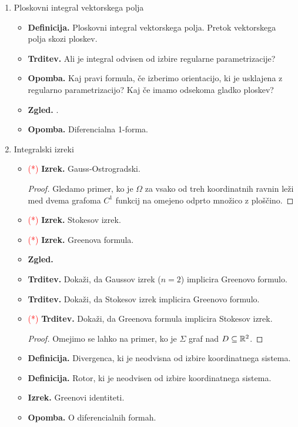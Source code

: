 \begin{enumerate}
    \item Ploskovni integral vektorskega polja
    \begin{itemize}
        \item \textbf{Definicija.} Ploskovni integral vektorskega polja. Pretok vektorskega polja skozi ploskev.
        \item \textbf{Trditev.} Ali je integral odvisen od izbire regularne parametrizacije?
        \item \textbf{Opomba.} Kaj pravi formula, če izberimo orientacijo, ki je usklajena z regularno parametrizacijo? Kaj če imamo odsekoma gladko ploskev?
        \item \textbf{Zgled.} .
        \item \textbf{Opomba.} Diferencialna 1-forma.
    \end{itemize}

    \item Integralski izreki
    \begin{itemize}
        \item \textcolor{red}{(*)} \textbf{Izrek.} Gauss-Ostrogradski.
        \begin{proof}
            Gledamo primer, ko je \(\Omega\) za vsako od treh koordinatnih ravnin leži med dvema grafoma \(C^1\) funkcij na omejeno odprto množico z ploščino.
        \end{proof}
        \item \textcolor{red}{(*)} \textbf{Izrek.} Stokesov izrek.
        \item \textcolor{red}{(*)} \textbf{Izrek.} Greenova formula.
        \item \textbf{Zgled.} 
        \item \textbf{Trditev.} Dokaži, da Gaussov izrek (\(n=2\)) implicira Greenovo formulo.
        \item \textbf{Trditev.} Dokaži, da Stokesov izrek implicira Greenovo formulo.
        \item \textcolor{red}{(*)} \textbf{Trditev.} Dokaži, da Greenova formula implicira Stokesov izrek.
        \begin{proof}
            Omejimo se lahko na primer, ko je \(\Sigma\) graf nad \(D \subseteq \mathbb{R}^2\).
        \end{proof}
        \item \textbf{Definicija.} Divergenca, ki je neodvisna od izbire koordinatnega sistema.
        \item \textbf{Definicija.} Rotor, ki je neodvisen od izbire koordinatnega sistema.
        \item \textbf{Izrek.} Greenovi identiteti.
        \item \textbf{Opomba.} O diferencialnih formah.
    \end{itemize}
\end{enumerate}